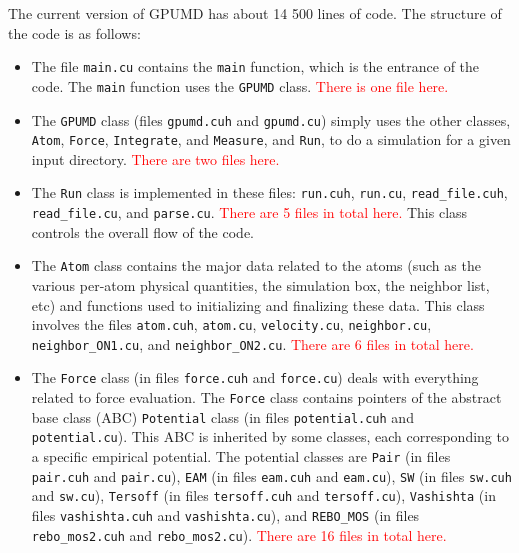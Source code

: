 \documentclass[12pt,a4paper]{report}
\begin{document}
The current version of GPUMD has about 14 500 lines of code. The structure of the code is as follows:
\begin{itemize}
\item The file \verb"main.cu" contains the \verb"main" function, which is the entrance of the code. The \verb"main" function uses the \verb"GPUMD" class. \textcolor{red}{There is one file here.}

\item The  \verb"GPUMD" class (files \verb"gpumd.cuh" and \verb"gpumd.cu") simply uses the other classes,  \verb"Atom", \verb"Force", \verb"Integrate", and \verb"Measure", and \verb"Run", to do a simulation for a given input directory. \textcolor{red}{There are two files here.}

\item The \verb"Run" class is implemented in these files: \verb"run.cuh", \verb"run.cu",  \verb"read_file.cuh", \verb"read_file.cu", and \verb"parse.cu". \textcolor{red}{There are 5 files in total here.} This class controls the overall flow of the code. 

\item The \verb"Atom" class contains the major data related to the atoms (such as the various per-atom physical quantities, the simulation box, the neighbor list, etc) and functions used to initializing and finalizing these data. This class involves the files \verb"atom.cuh", \verb"atom.cu", \verb"velocity.cu", \verb"neighbor.cu", \verb"neighbor_ON1.cu", and \verb"neighbor_ON2.cu". \textcolor{red}{There are 6 files in total here.}

\item The \verb"Force" class (in files \verb"force.cuh" and \verb"force.cu") deals with everything related to force evaluation. The \verb"Force" class contains pointers of the abstract base class (ABC) \verb"Potential" class (in files \verb"potential.cuh" and \verb"potential.cu"). This ABC is inherited by some classes, each corresponding to a specific empirical potential. The potential classes are \verb"Pair" (in files \verb"pair.cuh" and \verb"pair.cu"), \verb"EAM" (in files \verb"eam.cuh" and \verb"eam.cu"), \verb"SW" (in files \verb"sw.cuh" and \verb"sw.cu"), \verb"Tersoff" (in files \verb"tersoff.cuh" and \verb"tersoff.cu"), \verb"Vashishta" (in files \verb"vashishta.cuh" and \verb"vashishta.cu"), and \verb"REBO_MOS" (in files \verb"rebo_mos2.cuh" and \verb"rebo_mos2.cu"). \textcolor{red}{There are 16 files in total here.}


\end{itemize}
\end{document}
